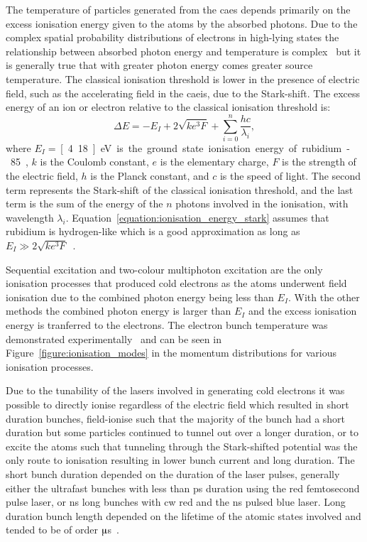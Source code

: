 The temperature of particles generated from the \gls{caes} depends primarily on the excess ionisation energy given to the atoms by the absorbed photons.
Due to the complex spatial probability distributions of electrons in high-lying states the relationship between absorbed photon energy and temperature is complex~\cite{mcculloch_high-coherence_2013} but it is generally true that with greater photon energy comes greater source temperature.
The classical ionisation threshold is lower in the presence of electric field, such as the accelerating field in the \gls{caeis}, due to the Stark-shift.
The excess energy of an ion or electron relative to the classical ionisation threshold is:
\begin{equation}\label{equation:ionisation_energy_stark}
\Delta E = -E_I + 2\sqrt{ke^3F} + \sum_{i=0}^{n}{\frac{hc}{\lambda_i}},
\end{equation}
where $E_I=$\,\unit[4.18]{eV} is the ground state ionisation energy of rubidium-85, $k$ is the Coulomb constant, $e$ is the elementary charge, $F$ is the strength of the electric field, $h$ is the Planck constant, and $c$ is the speed of light.
The second term represents the Stark-shift of the classical ionisation threshold, and the last term is the sum of the energy of the $n$ photons involved in the ionisation, with wavelength $\lambda_i$.
Equation~\ref{equation:ionisation_energy_stark} assumes that rubidium is hydrogen-like which is a good approximation as long as $E_I \gg 2\sqrt{ke^3F}$~\cite{gallagher_rydberg_2005}.

Sequential excitation and two-colour multiphoton excitation are the only ionisation processes that produced cold electrons as the atoms underwent field ionisation due to the combined photon energy being less than $E_I$.
With the other methods the combined photon energy is larger than $E_I$ and the excess ionisation energy is tranferred to the electrons.
The electron bunch temperature was demonstrated experimentally~\cite{speirs_identification_2017} and can be seen in Figure~\ref{figure:ionisation_modes} in the momentum distributions for various ionisation processes.

Due to the tunability of the lasers involved in generating cold electrons it was possible to directly ionise regardless of the electric field which resulted in short duration bunches, field-ionise such that the majority of the bunch had a short duration but some particles continued to tunnel out over a longer duration, or to excite the atoms such that tunneling through the Stark-shifted potential was the only route to ionisation resulting in lower bunch current and long duration.
The short bunch duration depended on the duration of the laser pulses, generally either the ultrafast bunches with less than \unit[320]{ps} duration using the red femtosecond pulse laser, or \unit[5]{ns} long bunches with \gls{cw} red and the \unit[5]{ns} pulsed blue laser.
Long duration bunch length depended on the lifetime of the atomic states involved and tended to be of order \unit[10]{$\muup$s}~\cite{speirs_identification_2017}.

